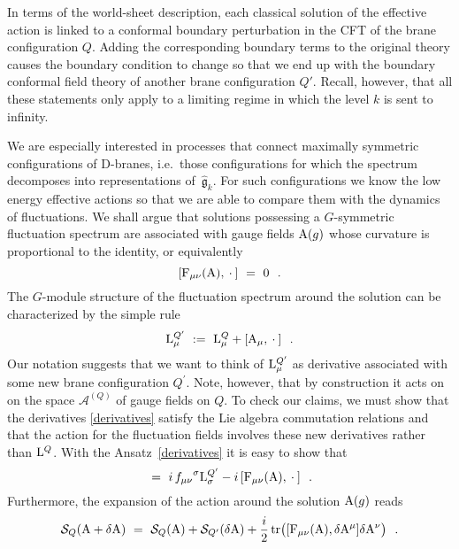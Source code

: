 \documentclass[12pt,a4paper]{article}
\newcommand{\tr}{\text{tr}}
\newcommand{\mf}{\mathfrak} %
\newcommand{\mc}{\mathcal} %
\def\cS{{\mathcal S}}
\def\tF{{\rm F}}
\def\tA{{\rm A}}
\def\tL{{\rm L}}
\def\asg{{\hat{\mf{g}}}}
\begin{document}
In terms of the world-sheet description, each classical solution of the
effective action is linked to a conformal boundary perturbation in the
CFT of the brane configuration $Q$. Adding the corresponding boundary
terms to the original theory causes the boundary condition to change
so that we end up with the boundary conformal field theory of another
brane configuration $Q'$. Recall, however, that all these statements
only apply to a limiting regime in which the level $k$ is sent to infinity.
\smallskip

We are especially interested in processes that connect maximally
symmetric configurations of D-branes, i.e.\ those configurations 
for which the spectrum decomposes into representations of~$\asg_k$. 
For such configurations we know the low energy effective actions 
so that we are able to compare them with the dynamics of fluctuations. 
We shall argue that solutions possessing a $G$-symmetric fluctuation 
spectrum are associated with gauge fields $\tA(g)$ whose curvature 
is proportional to the identity, or equivalently 
\begin{equation}\label{symmsol}
[\tF_{\mu\nu} (\tA),\:\cdot\:]\ =\ 0 \ \ .
\end{equation}
The $G$-module structure of the fluctuation spectrum around the 
solution can be characterized by the simple rule  
\begin{equation}\label{derivatives}
\tL^{Q^\prime}_{\mu}\ := \ \tL^{Q}_{\mu}+[\tA_{\mu},\:\cdot\:]\ \ .
\end{equation}
Our notation suggests that we want to think of $\tL^{Q^\prime}_\mu$ 
as derivative associated with some new brane configuration $Q^\prime$. 
Note, however, that by construction it acts on on the space $\mc{A}^
{(Q)}$ of gauge fields on $Q$. To check our claims, we must show that 
the derivatives \eqref{derivatives} satisfy the Lie algebra 
commutation relations and that the action for the fluctuation 
fields involves these new derivatives rather than $\tL^Q$. With 
the Ansatz~\eqref{derivatives} it is easy to show that 
\begin{equation*}
[\tL^{Q^\prime}_{\mu},\tL^{Q^\prime}_{\nu}] \ =\ 
i\,{f_{\mu\nu}}^{\sigma}\tL^{Q^\prime}_{\sigma}-i\,[\tF_{\mu\nu}
(\tA),\:\cdot\:]\ \ . 
\end{equation*}
Furthermore, the expansion of the action around the solution 
$\tA(g)$ reads 
\begin{equation*}
\cS_{Q} (\tA+\delta \tA) \ =\ \cS_{Q} (\tA)+\cS_{Q^\prime} 
(\delta \tA)+\frac{i}{2}\,\tr\bigl([\tF_{\mu\nu} (\tA),\delta 
\tA^{\mu}]\delta \tA^{\nu}
\bigr) \ \ .
\end{equation*}
\end{document}
